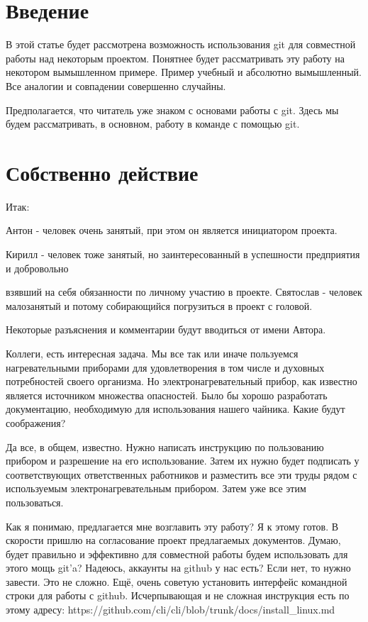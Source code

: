 \documentclass[14pt,a4paper]{article}
\begin{document}
\section{Введение}
В этой статье будет рассмотрена возможность использования git для совместной работы над 
некоторым проектом. Понятнее будет рассматривать эту работу на некотором вымышленном примере. 
Пример учебный и абсолютно вымышленный. Все аналогии и совпадении совершенно случайны.

Предполагается, что читатель уже знаком с основами работы с git. Здесь мы будем рассматривать,
в основном, работу в команде с помощью git.

\section{Собственно действие}
Итак:


Антон - человек очень занятый, при этом он является инициатором проекта.\par
Кирилл - человек тоже занятый, но заинтересованный в успешности предприятия и добровольно\par
взявший на себя обязанности по личному участию в проекте.
Святослав - человек малозанятый и потому собирающийся погрузиться в проект с головой.\par
Некоторые разъяснения и комментарии будут вводиться от имени Автора.


 Коллеги, есть интересная задача. Мы все так или иначе пользуемся нагревательными приборами
для удовлетворения в том числе и духовных потребностей своего организма. Но электронагревательный 
прибор, как известно является источником множества опасностей. Было бы хорошо разработать
документацию, необходимую для использования нашего чайника. Какие будут соображения?

 Да все, в общем, известно. Нужно написать инструкцию по пользованию прибором и разрешение
на его использование. 
Затем их нужно будет подписать у соответствующих ответственных работников и разместить все эти труды
рядом с используемым электронагревательным прибором. Затем уже все этим пользоваться. 

 Как я понимаю, предлагается мне возглавить эту работу? Я к этому готов. В скорости
пришлю на согласование проект предлагаемых документов. Думаю, будет правильно и эффективно
для совместной работы будем использовать для этого мощь git'a? Надеюсь, аккаунты на github у нас есть?
Если нет, то нужно завести. Это не сложно. Ещё, очень советую установить интерфейс командной
строки для работы с github. Исчерпывающая и не сложная инструкция есть по этому адресу:
https://github.com/cli/cli/blob/trunk/docs/install\_linux.md
\end{document}
